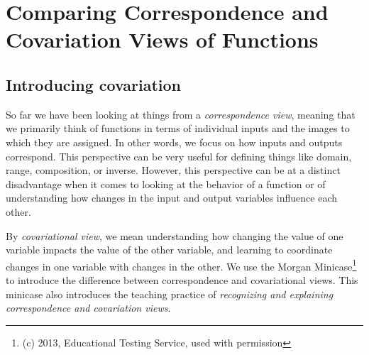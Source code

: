 \documentclass[11pt]{article}
\theoremstyle{definition}
\begin{document}

\newpage 
\section{Comparing Correspondence and Covariation Views of Functions}
\label{s: function covariation}

\subsection{Introducing covariation}

So far we have been looking at things from a {\it correspondence view}, meaning that we primarily think of functions in terms of individual inputs and the images to which they are assigned. In other words, we focus on how inputs and outputs correspond. This perspective can be very useful for defining things like domain, range, composition, or inverse. However, this perspective can be at a distinct disadvantage when it comes to looking at the behavior of a function or of understanding how changes in the input and output variables influence each other. 

By {\it covariational view}, we mean understanding how changing the value of one variable impacts the value of the other variable, and learning to coordinate changes in one variable with changes in the other. We use the Morgan Minicase\footnote{(c) 2013, Educational Testing Service, used with permission} to introduce the difference between correspondence and covariational views. This minicase also introduces the teaching practice of {\it recognizing and explaining correspondence and covariation views}.

\end{document}
